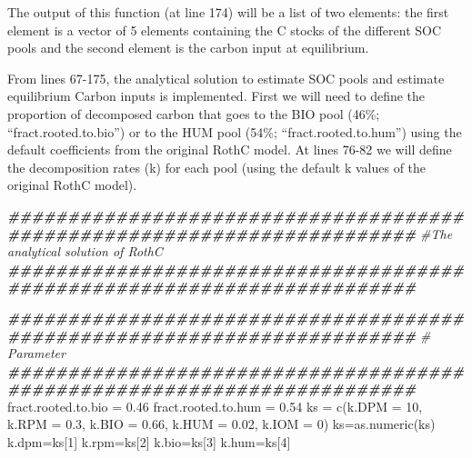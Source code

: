 \documentclass[
  10pt,
  b5paper,
]{book}
\newenvironment{Shaded}{\begin{snugshade}}{\end{snugshade}}
\newcommand{\AttributeTok}[1]{\textcolor[rgb]{0.77,0.63,0.00}{#1}}
\newcommand{\CommentTok}[1]{\textcolor[rgb]{0.56,0.35,0.01}{\textit{#1}}}
\newcommand{\DecValTok}[1]{\textcolor[rgb]{0.00,0.00,0.81}{#1}}
\newcommand{\DocumentationTok}[1]{\textcolor[rgb]{0.56,0.35,0.01}{\textbf{\textit{#1}}}}
\newcommand{\FloatTok}[1]{\textcolor[rgb]{0.00,0.00,0.81}{#1}}
\newcommand{\FunctionTok}[1]{\textcolor[rgb]{0.00,0.00,0.00}{#1}}
\newcommand{\NormalTok}[1]{#1}
\newcommand{\OtherTok}[1]{\textcolor[rgb]{0.56,0.35,0.01}{#1}}
\begin{document}
The output of this function (at line 174) will be a list of two elements: the first element is a vector of 5 elements containing the C stocks of the different SOC pools and the second element is the carbon input at equilibrium.

From lines 67-175, the analytical solution to estimate SOC pools and estimate equilibrium Carbon inputs is implemented. First we will need to define the proportion of decomposed carbon that goes to the BIO pool (46\%; ``fract.rooted.to.bio'') or to the HUM pool (54\%; ``fract.rooted.to.hum'') using the default coefficients from the original RothC model. At lines 76-82 we will define the decomposition rates (k) for each pool (using the default k values of the original RothC model).

\begin{Shaded}
\begin{Highlighting}[]
\DocumentationTok{\#\#\#\#\#\#\#\#\#\#\#\#\#\#\#\#\#\#\#\#\#\#\#\#\#\#\#\#\#\#\#\#\#\#\#\#\#\#\#\#\#\#\#\#\#\#\#\#\#\#\#\#\#\#\#\#\#\#\#\#\#\#\#\#\#\#\#\#\#\#\#\#}
  \CommentTok{\#The analytical solution of RothC}
  \DocumentationTok{\#\#\#\#\#\#\#\#\#\#\#\#\#\#\#\#\#\#\#\#\#\#\#\#\#\#\#\#\#\#\#\#\#\#\#\#\#\#\#\#\#\#\#\#\#\#\#\#\#\#\#\#\#\#\#\#\#\#\#\#\#\#\#\#\#\#\#\#\#\#\#\#}
  
  \DocumentationTok{\#\#\#\#\#\#\#\#\#\#\#\#\#\#\#\#\#\#\#\#\#\#\#\#\#\#\#\#\#\#\#\#\#\#\#\#\#\#\#\#\#\#\#\#\#\#\#\#\#\#\#\#\#\#\#\#\#\#\#\#\#\#\#\#\#\#\#\#\#\#\#\#}
  \CommentTok{\# Parameter}
  \DocumentationTok{\#\#\#\#\#\#\#\#\#\#\#\#\#\#\#\#\#\#\#\#\#\#\#\#\#\#\#\#\#\#\#\#\#\#\#\#\#\#\#\#\#\#\#\#\#\#\#\#\#\#\#\#\#\#\#\#\#\#\#\#\#\#\#\#\#\#\#\#\#\#\#\#}
\NormalTok{  fract.rooted.to.bio }\OtherTok{=} \FloatTok{0.46}
\NormalTok{  fract.rooted.to.hum }\OtherTok{=} \FloatTok{0.54}
\NormalTok{  ks }\OtherTok{=} \FunctionTok{c}\NormalTok{(}\AttributeTok{k.DPM =} \DecValTok{10}\NormalTok{, }\AttributeTok{k.RPM =} \FloatTok{0.3}\NormalTok{, }\AttributeTok{k.BIO =} \FloatTok{0.66}\NormalTok{, }\AttributeTok{k.HUM =} \FloatTok{0.02}\NormalTok{, }
         \AttributeTok{k.IOM =} \DecValTok{0}\NormalTok{)}
\NormalTok{  ks}\OtherTok{=}\FunctionTok{as.numeric}\NormalTok{(ks)}
\NormalTok{  k.dpm}\OtherTok{=}\NormalTok{ks[}\DecValTok{1}\NormalTok{]}
\NormalTok{  k.rpm}\OtherTok{=}\NormalTok{ks[}\DecValTok{2}\NormalTok{]}
\NormalTok{  k.bio}\OtherTok{=}\NormalTok{ks[}\DecValTok{3}\NormalTok{]}
\NormalTok{  k.hum}\OtherTok{=}\NormalTok{ks[}\DecValTok{4}\NormalTok{]}
\end{Highlighting}
\end{Shaded}
\end{document}
